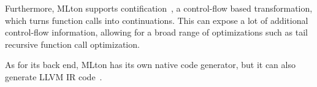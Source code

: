 \documentclass[main.tex]{subfiles}
\begin{document}
	Furthermore, MLton supports contification~\cite{contification}, a control-flow based transformation, which turns function calls into continuations. This can expose a lot of additional control-flow information, allowing for a broad range of optimizations such as tail recursive function call optimization.
	
	As for its back end, MLton has its own native code generator, but it can also generate LLVM IR code~\cite{mlton-llvm}.
	
	
	
\end{document}
